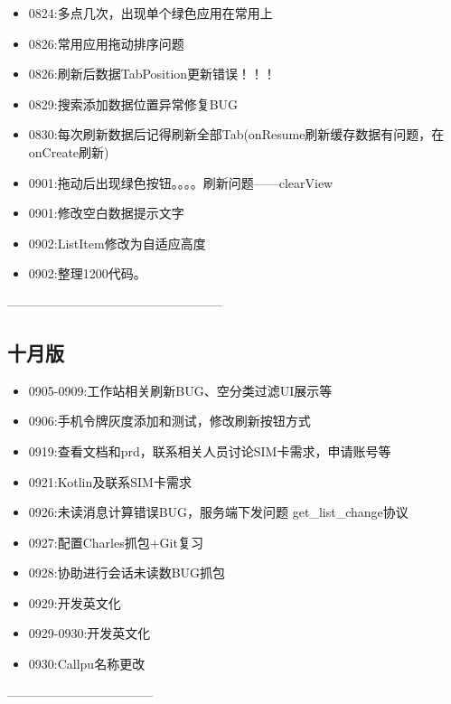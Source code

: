 \documentclass[12pt,a4paper]{ctexart}
\begin{document}
\begin{itemize}
		\item 0824:多点几次，出现单个绿色应用在常用上
		\item 0826:常用应用拖动排序问题
		\item 0826:刷新后数据TabPosition更新错误！！！
		\item 0829:搜索添加数据位置异常修复BUG
		\item 0830:每次刷新数据后记得刷新全部Tab(onResume刷新缓存数据有问题，在onCreate刷新)
		\item 0901:拖动后出现绿色按钮。。。。刷新问题——clearView
		\item 0901:修改空白数据提示文字
		\item 0902:ListItem修改为自适应高度
		
		\item 0902:整理1200代码。
	\end{itemize}
	—————————————————
	\newpage
	\subsection{十月版}
	\begin{itemize}
		\item 0905-0909:工作站相关刷新BUG、空分类过滤UI展示等
		\item 0906:手机令牌灰度添加和测试，修改刷新按钮方式
		\item 0919:查看文档和prd，联系相关人员讨论SIM卡需求，申请账号等
		\item 0921:Kotlin及联系SIM卡需求
		\item 0926:未读消息计算错误BUG，服务端下发问题
		\newline get\_list\_change协议
		\item 0927:配置Charles抓包+Git复习
		\item 0928:协助进行会话未读数BUG抓包
		\item 0929:开发英文化
		\item 0929-0930:开发英文化
		\item 0930:Callpu名称更改
		
	\end{itemize}
	-----------------------------------
	\newpage
\end{document}

